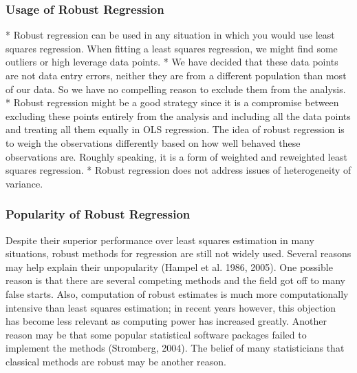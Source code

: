 \documentclass[residuals.tex]{subfiles}
\begin{document}
\subsubsection*{Usage of Robust Regression}

* Robust regression can be used in any situation in which you would use least squares regression. 
When fitting a least squares regression, we might find some outliers or high leverage data points.
* We have decided that these data points are not data entry errors, neither they are from a different population 
than most of our data. So we have no compelling reason to exclude them from the analysis. 
* Robust regression might be a good strategy since it is a compromise between excluding these points entirely from the analysis and including all the data points and treating all them equally in OLS regression. The idea of robust regression is to weigh the observations differently based on how well behaved these observations are. Roughly speaking, it is a form of weighted and reweighted least squares regression.
* Robust regression does not address issues of heterogeneity of variance. 


\newpage
\subsubsection*{Popularity of Robust Regression}
Despite their superior performance over least squares estimation in many situations, robust methods for regression are still not widely used. Several reasons may help explain their unpopularity (Hampel et al. 1986, 2005). One possible reason is that there are several competing methods and the field got off to many false starts. Also, computation of robust estimates is much more computationally intensive than least squares estimation; in recent years however, this objection has become less relevant as computing power has increased greatly. Another reason may be that some popular statistical software packages failed to implement the methods (Stromberg, 2004). The belief of many statisticians that classical methods are robust may be another reason.
\end{document}
